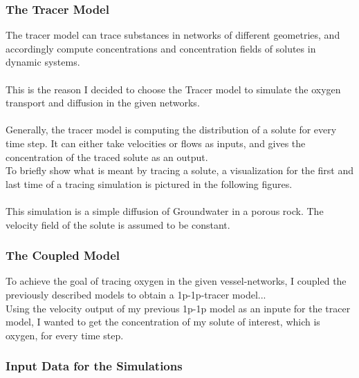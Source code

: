 \subsubsection*{The Tracer Model}

The tracer model can trace substances in networks of different geometries, and accordingly compute concentrations and concentration fields of solutes in dynamic systems.\\
\\This is the reason I decided to choose the Tracer model to simulate the oxygen transport and diffusion in the given networks.\\
\\Generally, the tracer model is computing the distribution of a solute for every time step. It can either take velocities or flows as inputs, and gives the concentration of the traced solute as an output.
\\To briefly show what is meant by tracing a solute, a visualization for the first and last time of a tracing simulation is pictured in the following figures.\\
\\This simulation is a simple diffusion of Groundwater in a porous rock. The velocity field of the solute is assumed to be constant.

\subsubsection*{The Coupled Model}

To achieve the goal of tracing oxygen in the given vessel-networks, I coupled the previously described models to obtain a 1p-1p-tracer model...
\\Using the velocity output of my previous 1p-1p model as an inpute for the tracer model, I wanted to get the concentration of my solute of interest, which is oxygen, for every time step.

\subsubsection{Input Data for the Simulations}


